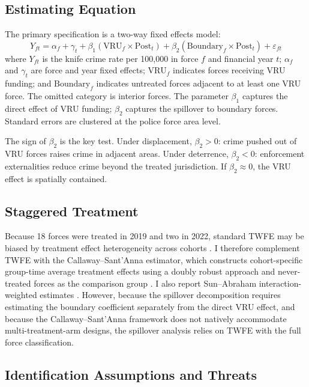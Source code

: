 \documentclass[12pt]{article}
\begin{document}
\subsection{Estimating Equation}

The primary specification is a two-way fixed effects model:
\begin{equation}
Y_{ft} = \alpha_f + \gamma_t + \beta_1 (\text{VRU}_f \times \text{Post}_t) + \beta_2 (\text{Boundary}_f \times \text{Post}_t) + \varepsilon_{ft}
\label{eq:main}
\end{equation}
where $Y_{ft}$ is the knife crime rate per 100,000 in force $f$ and financial year $t$; $\alpha_f$ and $\gamma_t$ are force and year fixed effects; $\text{VRU}_f$ indicates forces receiving VRU funding; and $\text{Boundary}_f$ indicates untreated forces adjacent to at least one VRU force. The omitted category is interior forces. The parameter $\beta_1$ captures the direct effect of VRU funding; $\beta_2$ captures the spillover to boundary forces. Standard errors are clustered at the police force area level.

The sign of $\beta_2$ is the key test. Under displacement, $\beta_2 > 0$: crime pushed out of VRU forces raises crime in adjacent areas. Under deterrence, $\beta_2 < 0$: enforcement externalities reduce crime beyond the treated jurisdiction. If $\beta_2 \approx 0$, the VRU effect is spatially contained.

\subsection{Staggered Treatment}

Because 18 forces were treated in 2019 and two in 2022, standard TWFE may be biased by treatment effect heterogeneity across cohorts \citep{goodmanbacon2021did, dechaisemartin2020two}. I therefore complement TWFE with the Callaway--Sant'Anna estimator, which constructs cohort-specific group-time average treatment effects using a doubly robust approach and never-treated forces as the comparison group \citep{callaway2021did}. I also report Sun--Abraham interaction-weighted estimates \citep{sun2021estimating}. However, because the spillover decomposition requires estimating the boundary coefficient separately from the direct VRU effect, and because the Callaway--Sant'Anna framework does not natively accommodate multi-treatment-arm designs, the spillover analysis relies on TWFE with the full force classification.

\subsection{Identification Assumptions and Threats}
\end{document}
